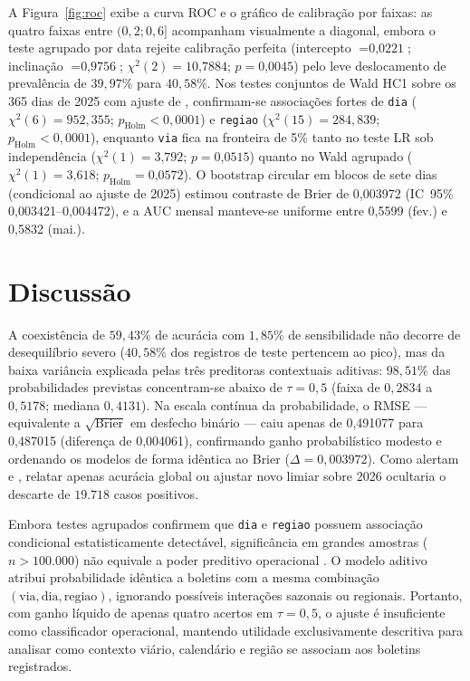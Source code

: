 \documentclass[
  article,
  12pt,
  oneside,
  a4paper,
  section=TITLE,
  english,
  brazil
]{abntex2}\usepackage[]{graphicx}\usepackage[]{xcolor}
\begin{document}
A Figura~\ref{fig:roc} exibe a curva ROC e o gráfico de calibração por faixas: as quatro faixas entre $(0{,}2; 0{,}6]$ acompanham visualmente a diagonal, embora o teste agrupado por data rejeite calibração perfeita (intercepto $= \text{0,0221}$; inclinação $= \text{0,9756}$; $\chi^2(2) = \text{10,7884}$; $p = \text{0,0045}$) pelo leve deslocamento de prevalência de $39{,}97\%$ para $40{,}58\%$. Nos testes conjuntos de Wald HC1 sobre os 365 dias de 2025 com ajuste de \textcite{holm1979}, confirmam-se associações fortes de \texttt{dia} ($\chi^2(6) = 952{,}355$; $p_{\mathrm{Holm}} < 0{,}0001$) e \texttt{regiao} ($\chi^2(15) = 284{,}839$; $p_{\mathrm{Holm}} < 0{,}0001$), enquanto \texttt{via} fica na fronteira de 5\% tanto no teste LR sob independência ($\chi^2(1) = \text{3,792}$; $p = \text{0,0515}$) quanto no Wald agrupado ($\chi^2(1) = \text{3,618}$; $p_{\mathrm{Holm}} = \text{0,0572}$). O bootstrap circular em blocos de sete dias (condicional ao ajuste de 2025) estimou contraste de Brier de 0,003972 (IC~95\% 0,003421--0,004472), e a AUC mensal manteve-se uniforme entre 0,5599 (fev.) e 0,5832 (mai.).

\section{Discussão}

A coexistência de $59{,}43\%$ de acurácia com $1{,}85\%$ de sensibilidade não decorre de desequilíbrio severo ($40{,}58\%$ dos registros de teste pertencem ao pico), mas da baixa variância explicada pelas três preditoras contextuais aditivas: $98{,}51\%$ das probabilidades previstas concentram-se abaixo de $\tau = 0{,}5$ (faixa de $0{,}2834$ a $0{,}5178$; mediana $0{,}4131$). Na escala contínua da probabilidade, o RMSE --- equivalente a $\sqrt{\mathrm{Brier}}$ em desfecho binário --- caiu apenas de 0,491077 para 0,487015 (diferença de 0,004061), confirmando ganho probabilístico modesto e ordenando os modelos de forma idêntica ao Brier ($\Delta = 0{,}003972$). Como alertam \textcite{bruce2019} e \textcite{lones2024}, relatar apenas acurácia global ou ajustar novo limiar sobre 2026 ocultaria o descarte de $19.718$ casos positivos.

Embora testes agrupados confirmem que \texttt{dia} e \texttt{regiao} possuem associação condicional estatisticamente detectável, significância em grandes amostras ($n > 100.000$) não equivale a poder preditivo operacional \parencite{james2021}. O modelo aditivo atribui probabilidade idêntica a boletins com a mesma combinação $(\text{via}, \text{dia}, \text{regiao})$, ignorando possíveis interações sazonais ou regionais. Portanto, com ganho líquido de apenas quatro acertos em $\tau = 0{,}5$, o ajuste é insuficiente como classificador operacional, mantendo utilidade exclusivamente descritiva para analisar como contexto viário, calendário e região se associam aos boletins registrados.
\end{document}
